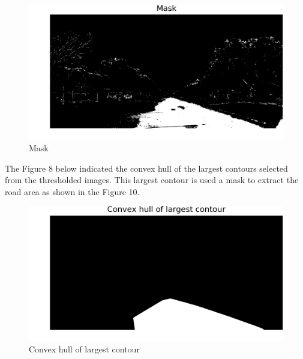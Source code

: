 \documentclass[journal]{IEEEtran}
\begin{document}
\begin{figure}[!htb]
\begin{center}
\includegraphics[scale=0.65]{Images/4_Mask.png}
\end{center}
\caption{Mask}
\end{figure}

\vspace{0.5cm}

\noindent The Figure 8 below indicated the convex hull of the largest contours selected from the thresholded images. This largest contour is used a mask to extract the road area as shown in the Figure 10.


\begin{figure}[!htb]
\begin{center}
\includegraphics[scale=0.65]{Images/5_Convex_hull_of_largest_contour.png}
\end{center}
\caption{Convex hull of largest contour}
\end{figure}
\end{document}
